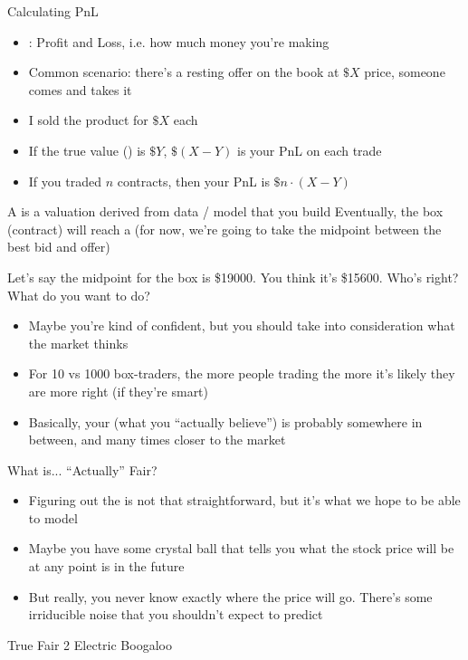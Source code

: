 
Calculating PnL
\begin{itemize}
    \item {}: Profit and Loss, i.e. how much money you're making
    \item Common scenario: there's a resting offer on the book at $ \$X $ price, someone comes and takes it
    \item I sold the product for $ \$X $ each
    \item If the true value () is $ \$Y $, $ \$(X-Y) $ is your PnL on each trade
    \item If you traded $ n $ contracts, then your PnL is $ \$n \cdot (X-Y) $
\end{itemize}

A  is a valuation derived from data / model that you build
Eventually, the box (contract) will reach a  (for now, we're going to take the midpoint between the best bid and offer)

Let's say the midpoint for the box is \$19000. You think it's \$15600. Who's right? What do you want to do?
\begin{itemize}
    \item Maybe you're kind of confident, but you should take into consideration what the market thinks
    \item For 10 vs 1000 box-traders, the more people trading the more it's likely they are more right (if they're smart)
    \item Basically, your  (what you ``actually believe'') is probably somewhere in between, and many times closer to the market
\end{itemize}

What is... ``Actually'' Fair?
\begin{itemize}
    \item Figuring out the  is not that straightforward, but it's what we hope to be able to model
    \item Maybe you have some crystal ball that tells you what the stock price will be at any point is in the future
    \item But really, you never know exactly where the price will go. There's some irriducible noise that you shouldn't expect to predict
\end{itemize}

True Fair 2 Electric Boogaloo

